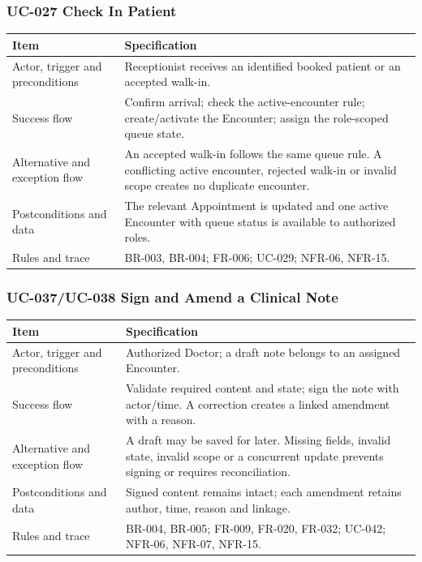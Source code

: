 \documentclass[a4paper,12pt]{article}
\begin{document}
\subsubsection{UC-027 Check In Patient}
\begin{longtable}{@{}p{}p{}@{}}
\toprule Item & Specification \\
\midrule
Actor, trigger and preconditions & Receptionist receives an identified booked patient or an accepted walk-in. \\
Success flow & Confirm arrival; check the active-encounter rule; create/activate the Encounter; assign the role-scoped queue state. \\
Alternative and exception flow & An accepted walk-in follows the same queue rule. A conflicting active encounter, rejected walk-in or invalid scope creates no duplicate encounter. \\
Postconditions and data & The relevant Appointment is updated and one active Encounter with queue status is available to authorized roles. \\
Rules and trace & BR-003, BR-004; FR-006; UC-029; NFR-06, NFR-15. \\
\bottomrule
\end{longtable}

\subsubsection{UC-037/UC-038 Sign and Amend a Clinical Note}
\begin{longtable}{@{}p{}p{}@{}}
\toprule Item & Specification \\
\midrule
Actor, trigger and preconditions & Authorized Doctor; a draft note belongs to an assigned Encounter. \\
Success flow & Validate required content and state; sign the note with actor/time. A correction creates a linked amendment with a reason. \\
Alternative and exception flow & A draft may be saved for later. Missing fields, invalid state, invalid scope or a concurrent update prevents signing or requires reconciliation. \\
Postconditions and data & Signed content remains intact; each amendment retains author, time, reason and linkage. \\
Rules and trace & BR-004, BR-005; FR-009, FR-020, FR-032; UC-042; NFR-06, NFR-07, NFR-15. \\
\bottomrule
\end{longtable}
\end{document}
